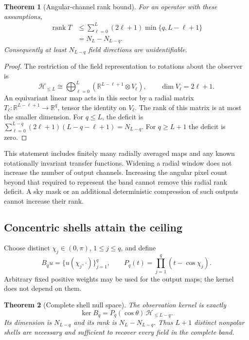 \documentclass[aps,prd,reprint,amsmath,amssymb,nofootinbib,
longbibliography]{revtex4-2}
\newtheorem{theorem}{Theorem}
\DeclareMathOperator{\rank}{rank}
\newcommand{\HH}{\mathcal H}
\begin{document}
\begin{theorem}[Angular-channel rank bound]
\label{thm:ceiling}
For an operator with these assumptions,
\begin{align}
 \rank T&\leq\sum_{\ell=0}^L(2\ell+1)
       \min\{q,L-\ell+1\}\\
 &=N_L-N_{L-q} .
 \label{eq:ceiling}
\end{align}
Consequently at least $N_{L-q}$ field directions are unidentifiable.
\end{theorem}

\begin{proof}
The restriction of the field representation to rotations about the observer
is
\begin{equation}
 \HH_{\leq L}\cong\bigoplus_{\ell=0}^L
 \left(\mathbb R^{L-\ell+1}\otimes V_\ell\right),
 \qquad \dim V_\ell=2\ell+1.
\end{equation}
An equivariant linear map acts in this sector by a radial matrix
$T_\ell:\mathbb R^{L-\ell+1}\to\mathbb R^q$, tensor the identity on
$V_\ell$. The rank of this matrix is at most the smaller dimension.
For $q\leq L$, the deficit is
$\sum_{\ell=0}^{L-q}(2\ell+1)(L-q-\ell+1)=N_{L-q}$.
For $q\geq L+1$ the deficit is zero.
\end{proof}

This statement includes finitely many radially averaged maps and any
known rotationally invariant transfer functions. Widening a radial
window does not increase the number of output channels. Increasing the
angular pixel count beyond that required to represent the band cannot
remove this radial rank deficit. A sky mask or an additional deterministic
compression of such outputs cannot increase their rank.

\subsection{Concentric shells attain the ceiling}

Choose distinct $\chi_j\in(0,\pi)$, $1\leq j\leq q$, and define
\begin{equation}
 B_q u=\{u(\chi_j,\cdot)\}_{j=1}^q,
 \qquad P_q(t)=\prod_{j=1}^q(t-\cos\chi_j).
\end{equation}
Arbitrary fixed positive weights may be used for the output maps; the
kernel does not depend on them.

\begin{theorem}[Complete shell null space]
\label{thm:kernel}
The observation kernel is exactly
\begin{equation}
 \boxed{\ker B_q=P_q(\cos\theta)\,\HH_{\leq L-q}.}
 \label{eq:kernel}
\end{equation}
Its dimension is $N_{L-q}$ and its rank is $N_L-N_{L-q}$.
Thus $L+1$ distinct nonpolar shells are necessary and sufficient to
recover every field in the complete band.
\end{theorem}
\end{document}
